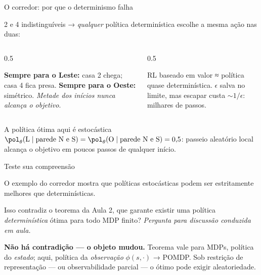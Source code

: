 \documentclass[aspectratio=169, 11pt]{beamer}
\newcommand{\paradiscussao}{\smallskip
  {\footnotesize\color{rlCinza}\itshape Pergunta para discussão conduzida em aula.}}
\newcommand{\thv}{\theta}                       %
\newcommand{\polth}{\pol_{\thv}}                %
\newcommand{\feat}{\phi}                        %
\begin{document}
\begin{frame}{O corredor: por que o determinismo falha}

  2 e 4 indistinguíveis → \emph{qualquer} política determinística escolhe a
  mesma ação nas duas:

  \begin{columns}[T]
  \begin{column}{0.5\textwidth}
    \begin{alertabox}
      \textbf{Sempre para o Leste:} casa 2 chega; casa 4 fica presa.
      \textbf{Sempre para o Oeste:} simétrico. \emph{Metade dos inícios nunca
      alcança o objetivo}.
    \end{alertabox}
  \end{column}
  \begin{column}{0.5\textwidth}
    \begin{ideiabox}
      RL baseado em valor ≈ política quase determinística. $\epsilon$ salva no
      limite, mas escapar custa $\sim 1/\epsilon$: milhares de passos.
    \end{ideiabox}
  \end{column}
  \end{columns}

  \begin{teobox}{A política ótima aqui é estocástica}
    $\polth(\text{L}\mid \text{parede N e S}) = \polth(\text{O}\mid \text{parede N e S}) = 0{,}5$:
    passeio aleatório local alcança o objetivo em poucos passos de qualquer
    início.
  \end{teobox}
\end{frame}

\begin{frame}{Teste sua compreensão}

  \begin{quizbox}{}
    O exemplo do corredor mostra que políticas estocásticas podem ser
    estritamente melhores que determinísticas.

    \smallskip
    Isso contradiz o teorema da Aula 2, que garante existir uma política
    \emph{determinística} ótima para todo MDP finito?
    \paradiscussao
  \end{quizbox}

  \pause

  \begin{respbox}
    \textbf{Não há contradição --- o objeto mudou.} Teorema vale para MDPs,
    política do \emph{estado}; aqui, política da \emph{observação}
    $\feat(s,\cdot)$ → POMDP. Sob restrição de representação --- ou
    observabilidade parcial --- o ótimo pode exigir aleatoriedade.
  \end{respbox}
\end{frame}
\end{document}
